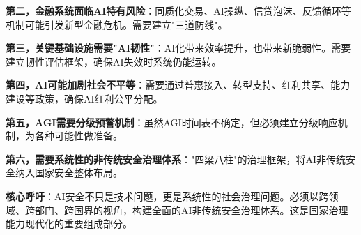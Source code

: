 \textbf{第二，金融系统面临AI特有风险}：同质化交易、AI操纵、信贷泡沫、反馈循环等机制可能引发新型金融危机。需要建立"三道防线"。

\textbf{第三，关键基础设施需要"AI韧性"}：AI化带来效率提升，也带来新脆弱性。需要建立韧性评估框架，确保AI失效时系统仍能运转。

\textbf{第四，AI可能加剧社会不平等}：需要通过普惠接入、转型支持、红利共享、能力建设等政策，确保AI红利公平分配。

\textbf{第五，AGI需要分级预警机制}：虽然AGI时间表不确定，但必须建立分级响应机制，为各种可能性做准备。

\textbf{第六，需要系统性的非传统安全治理体系}："四梁八柱"的治理框架，将AI非传统安全纳入国家安全整体布局。

\textbf{核心呼吁}：AI安全不只是技术问题，更是系统性的社会治理问题。必须以跨领域、跨部门、跨国界的视角，构建全面的AI非传统安全治理体系。这是国家治理能力现代化的重要组成部分。

